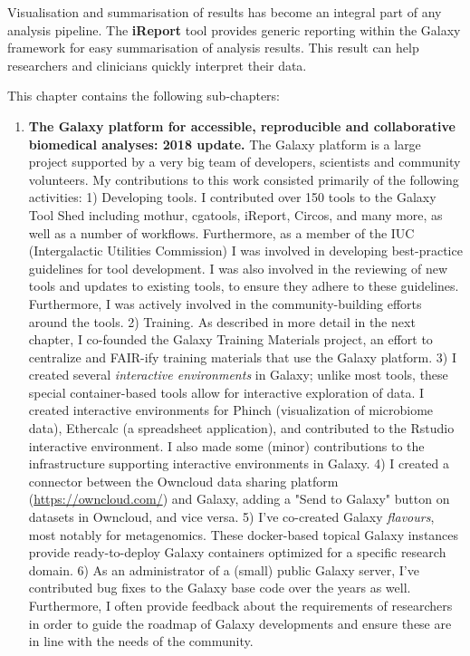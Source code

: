 Visualisation and summarisation of results has become an integral part of any analysis pipeline. The \textbf{iReport} tool provides generic reporting within the Galaxy framework for easy summarisation of analysis results. This result can help researchers and clinicians quickly interpret their data.


This chapter contains the following sub-chapters:

\begin{enumerate}[label=\ref{chapter:general}.\arabic*]
\itemsep-0.5em
\setcounter{enumi}{-1}
\item \textbf{The Galaxy platform for accessible, reproducible and collaborative biomedical analyses: 2018 update.} The Galaxy platform is a large project supported by a very big team of developers, scientists and community volunteers. My contributions to this work consisted primarily of the following activities: 1) Developing tools. I contributed over 150 tools to the Galaxy Tool Shed including mothur, cgatools, iReport, Circos, and many more, as well as a number of workflows. Furthermore, as a member of the IUC (Intergalactic Utilities Commission) I was involved in developing best-practice guidelines for tool development. I was also involved in the reviewing of new tools and updates to existing tools, to ensure they adhere to these guidelines. Furthermore, I was actively involved in the community-building efforts around the tools. 2) Training. As described in more detail in the next chapter, I co-founded the Galaxy Training Materials project, an effort to centralize and FAIR-ify training materials that use the Galaxy platform. 3) I created several \emph{interactive environments} in Galaxy; unlike most tools, these special container-based tools allow for interactive exploration of data. I created interactive environments for Phinch (visualization of microbiome data), Ethercalc (a spreadsheet application), and contributed to the Rstudio interactive environment. I also made some (minor) contributions to the infrastructure supporting interactive environments in Galaxy. 4) I created a connector between the Owncloud data sharing platform (\url{https://owncloud.com/}) and Galaxy, adding a "Send to Galaxy" button on datasets in Owncloud, and vice versa. 5) I've co-created Galaxy \emph{flavours}, most notably for metagenomics. These docker-based topical Galaxy instances provide ready-to-deploy Galaxy containers optimized for a specific research domain. 6) As an administrator of a (small) public Galaxy server, I've contributed bug fixes to the Galaxy base code over the years as well. Furthermore, I often provide feedback about the requirements of researchers in order to guide the roadmap of Galaxy developments and ensure these are in line with the needs of the community.



\end{enumerate}
